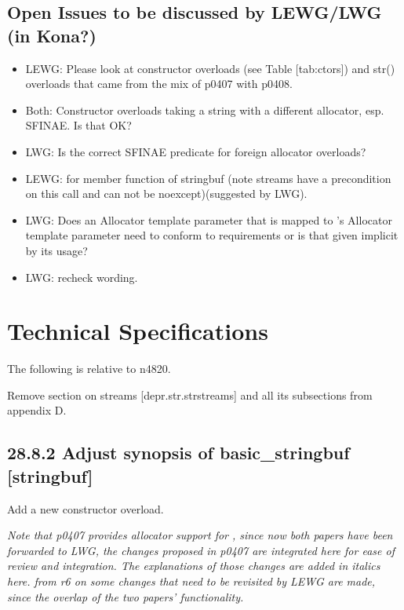 \documentclass[ebook,11pt,article]{memoir}
\renewcommand{\ref}[1]{[#1]}
\begin{document}
\section{Open Issues to be discussed by LEWG/LWG (in Kona?)}
\begin{itemize}
\item LEWG: Please look at constructor overloads (see Table \ref{tab:ctors}) and str() overloads that came from the mix of p0407 with p0408.
\item Both: Constructor overloads taking a string with a different allocator, esp. SFINAE. Is that OK?
\item LWG: Is  the correct SFINAE predicate for foreign allocator overloads?
\item LEWG:  for  member function of stringbuf (note streams have a precondition on this call and can not be noexcept)(suggested by LWG).
\item LWG: Does an Allocator template parameter that is mapped to 's Allocator template parameter need to conform to  requirements or is that given implicit by its usage?
\item LWG: recheck wording.
\end{itemize}


\chapter{Technical Specifications}
The following is relative to n4820.

Remove section on  streams [depr.str.strstreams] and all its subsections from appendix D.

\section{28.8.2 Adjust synopsis of basic\_stringbuf [stringbuf]}
Add a new constructor overload.

\textit{Note that p0407 provides allocator support for , since now both papers have been forwarded to LWG, the changes proposed in p0407 are integrated here for ease of review and integration. The explanations of those changes are added in italics here. from r6 on some changes that need to be revisited by LEWG are made, since the overlap of the two papers' functionality.}
\end{document}
